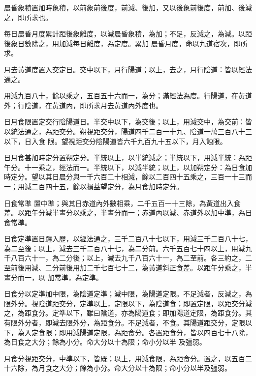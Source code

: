 \begin{pinyinscope}
 晨昏象積置加時象積，以前象前後度，前減、後加，又以後象前後度，前加、後減之，即所求也。



 每日晨昏月度累計距後象離度，以減晨昏象積，為加；不足，反減之，為減。以距後象日數除之，用加減每日離度，為定度。累加
 晨昏月度，命以九道宿次，即所求。



 月去黃道度置入交定日。交中以下，月行陽道；以上，去之，月行陰道：皆以經法通之。



 用減九百八十，餘以乘之，五百五十六而一，為分；滿經法為度。行陽道，在黃道外；行陰道，在黃道內，即所求月去黃道內外度也。



 日月食限置定交行陰陽道日。半交中以下，為交後；以上，用減交中，為交前：皆以統法通之，為距交分。朔視距交分，陽道四千二百一十九、陰道一萬三百八十三以下，日入食
 限。望視距交分陰陽道皆六千九百九十五以下，月入蝕限。



 日月食甚加時定分置朔定分。半統以上，以半統減之；半統以下，用減半統：為距午分。十一乘之，經法而一。半統以下，以減半統；以上，以加朔定分：為日食加時定分。望以其日晨分與一千六百二十相減，餘以二百四十五乘之，三百一十三而一；用減二百四十五，餘以損益望定分，為月食加時定分。



 日食常準
 置中準；與其日赤道內外數相乘，二千五百一十三除，為黃道出入食差。以距午分減半晝分以乘之，半晝分而一；赤道內以減、赤道外以加中準，為日食常準。



 日食定準置日躔入歷，以經法通之，三千二百八十七以下，用減三千二百八十七，為二至後；以上，減去三千二百八十七，為二分前。六千五百七十四以上，用減九千八百六十一，為二分後；以上，減去九千八百六十一，為二至前。各三約之，二至前後用減、二分前後用加二千七百七十二，為黃道斜正食差。以距午分乘之，半晝分而一，以
 加常準，為定準。



 日食分以定準加中限，為陰道定準；減中限，為陽道定限。不足減者，反減之，為限外分。視陰道距交分，定準以上，定限以下，為陰道食；即置定限，以距交分減之，為距食分。定準以下，雖曰陰道，亦為陽道食；即加陽道定限，為距食分。其有限外分者，即減去限外分，為距食分。不足減者，不食。其陽道距交分，定限以下，為入定食限；即用減陽道定限，為距食分。各置距食分，皆以四百七十八除，為日食之大分；餘為小分。命大分以十為限；命小分以半
 及彊弱。



 月食分視距交分，中準以下，皆既；以上，用減食限，為距食分。置之，以五百二十六除，為月食之大分；餘為小分。命大分以十為限；命小分以半及彊弱。




\end{pinyinscope}
